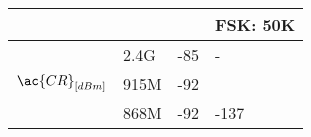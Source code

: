 \begin{tabular}{l|l|l|l}
	\                                  &                  &              & FSK:	50K         \\\hline
	\multirow{3}{*}{$\ac{CR}_{[dBm]}$} & 2.4G             & -85          & -                \\
	\                                  & 915M             & -92          & \ko              \\
	\                                  & 868M             & -92          & -137             \\\hline

\end{tabular}
